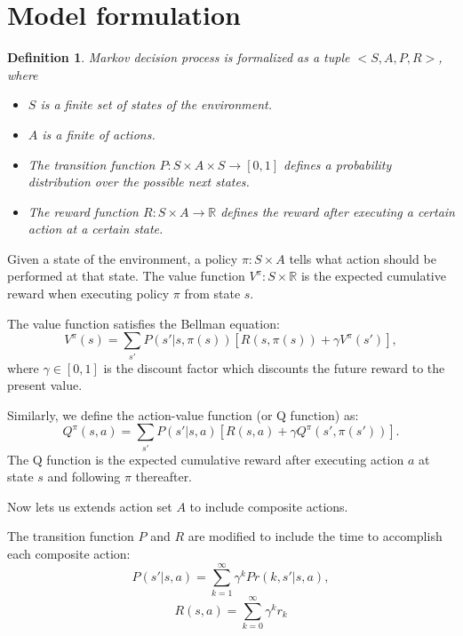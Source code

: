 \documentclass{article} %
\newtheorem{definition}{Definition}
\begin{document}

\section{Model formulation}

\begin{definition} Markov decision process is formalized as a tuple $<S, A, P, R>$, where
\begin{itemize}{}
\item $S$ is a finite set of states of the environment.
\item $A$ is a finite of actions.
\item The transition function $P:S \times A \times S \rightarrow [0, 1]$ defines a probability distribution over the possible next states. 
\item The reward function $R:S \times A \rightarrow \mathbb{R}$ defines the reward after executing a certain action at a certain state.
\end{itemize}
\end{definition}

Given a state of the environment, a policy $\pi: S \times A$ tells what action should be performed at that state. 
The value function $V^{\pi}: S \times \mathbb{R}$ is the expected cumulative reward when executing
policy $\pi$ from state $s$.

The value function satisfies the Bellman equation:
\begin{equation}
    V^{\pi}(s) = \sum_{s'}P(s'|s, \pi(s))[R(s, \pi(s)) + \gamma V^{\pi}(s')],
    \label{eq:V}
\end{equation}
where $\gamma \in [0, 1]$ is the discount factor which discounts the future reward to the present value.

Similarly, we define the action-value function (or Q function) as:
\begin{equation}
    Q^{\pi}(s, a) = \sum_{s'}P(s'|s, a)[R(s, a) + \gamma Q^{\pi}(s', \pi(s'))].
    \label{eq:Q}
\end{equation}
The Q function is the expected cumulative reward after executing action $a$ at state $s$ and following
$\pi$ thereafter.

Now lets us extends action set $A$ to include composite actions.

The transition function $P$ and $R$ are modified to include the time to accomplish each composite action:
\begin{equation}
    P(s'|s, a) = \sum^{\infty}_{k=1} \gamma^k Pr(k, s'|s, a),
    \label{eq:multiProb}
\end{equation}
\begin{equation}
    R(s, a) = \sum^{\infty}_{k=0} \gamma^k r_k
\end{equation}
\end{document}
